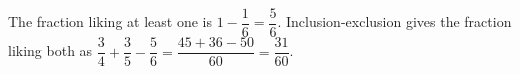 The fraction liking at least one is $1-\dfrac{1}{6}=\dfrac{5}{6}$. Inclusion-exclusion gives the fraction liking both as $\dfrac{3}{4}+\dfrac{3}{5}-\dfrac{5}{6}=\dfrac{45+36-50}{60}=\boxed{\dfrac{31}{60}}$.
